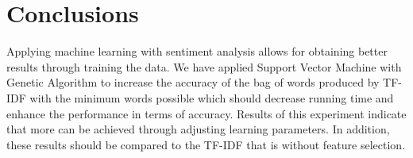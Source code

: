 \documentclass[runningheads,a4paper]{llncs}
\begin{document}
\section{Conclusions}
\label{conclusion}

Applying machine learning with sentiment analysis allows for obtaining better results through training the data. We have applied Support Vector Machine with Genetic Algorithm to increase the accuracy of the bag of words produced by TF-IDF with the minimum words possible which should decrease running time and enhance the performance in terms of accuracy. Results of this experiment indicate that more can be achieved through adjusting learning parameters. In addition, these results should be compared to the TF-IDF that is without feature selection.



\end{document}
